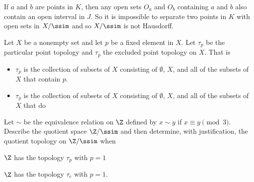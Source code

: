\item If $a$ and $b$ are points in $K$, then any open sets $O_a$ and $O_b$ containing $a$ and $b$ also contain an open interval in $J$. So it is impossible to separate two points in $K$ with open sets in $X/\ssim$ and so $X/\ssim$ is not Hausdorff. 

\ea


\item Let $X$ be a nonempty set and let $p$ be a fixed element in $X$. Let $\tau_p$ be the particular point topology and $\tau_{\overline{p}}$ the excluded point topology on $X$. That is
\begin{itemize}
\item $\tau_{p}$ is the collection of subsets of $X$ consisting of $\emptyset$, $X$, and all of the subsets of $X$ that contain $p$.  
\item $\tau_{\overline{p}}$ is the collection of subsets of $X$ consisting of $\emptyset$, $X$, and all of the subsets of $X$ that do 
\end{itemize}
Let $\sim$ be the equivalence relation on $\Z$ defined by $x \sim y$ if $x \equiv y \pmod{3}$. Describe the quotient space $\Z/\ssim$ and then determine, with justification, the quotient topology on $\Z/\ssim$ when
	\ba
		
	\item $\Z$ has the topology $\tau_{p}$ with $p = 1$
	
	\item $\Z$ has the topology $\tau_{e}$ with $p = 1$.		
	
	\ea
	


